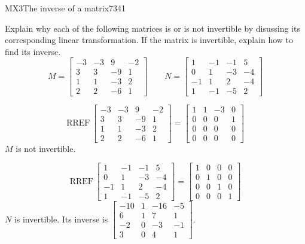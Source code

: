 \begin{exercise}{MX3}{The inverse of a matrix}{7341} 
\begin{exerciseStatement} 

 Explain why each of the following matrices is or is not invertible by disussing its corresponding linear transformation. If the matrix is invertible, explain how to find its inverse. \[
\hspace{2em}
M = \left[\begin{array}{cccc}
-3 & -3 & 9 & -2 \\
3 & 3 & -9 & 1 \\
1 & 1 & -3 & 2 \\
2 & 2 & -6 & 1
\end{array}\right]
\hspace{2em}
N = \left[\begin{array}{cccc}
1 & -1 & -1 & 5 \\
0 & 1 & -3 & -4 \\
-1 & 1 & 2 & -4 \\
1 & -1 & -5 & 2
\end{array}\right]
\hspace{2em}
        \] 

 \end{exerciseStatement}
 \begin{exerciseAnswer} 

 \[\mathrm{RREF}\,\left[\begin{array}{cccc}
-3 & -3 & 9 & -2 \\
3 & 3 & -9 & 1 \\
1 & 1 & -3 & 2 \\
2 & 2 & -6 & 1
\end{array}\right]=\left[\begin{array}{cccc}
1 & 1 & -3 & 0 \\
0 & 0 & 0 & 1 \\
0 & 0 & 0 & 0 \\
0 & 0 & 0 & 0
\end{array}\right]\] \(M\) is not invertible. 

 

 \[\mathrm{RREF}\,\left[\begin{array}{cccc}
1 & -1 & -1 & 5 \\
0 & 1 & -3 & -4 \\
-1 & 1 & 2 & -4 \\
1 & -1 & -5 & 2
\end{array}\right]=\left[\begin{array}{cccc}
1 & 0 & 0 & 0 \\
0 & 1 & 0 & 0 \\
0 & 0 & 1 & 0 \\
0 & 0 & 0 & 1
\end{array}\right]\] \(N\) is invertible. Its inverse is \(\left[\begin{array}{cccc}
-10 & 1 & -16 & -5 \\
6 & 1 & 7 & 1 \\
-2 & 0 & -3 & -1 \\
3 & 0 & 4 & 1
\end{array}\right]\). 

 \end{exerciseAnswer}
 \end{exercise}


